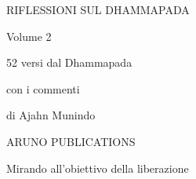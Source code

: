 \documentclass[a4paper,portrait,12pt]{article}
\begin{document}
\setlength{\oddsidemargin}{2cm-1in}
\setlength{\textwidth}{\paperwidth - 2cm-2cm}

RIFLESSIONI SUL DHAMMAPADA





Volume 2





52 versi dal Dhammapada


con i commenti


di Ajahn Munindo






















































































ARUNO PUBLICATIONS


\newpage






Mirando all'obiettivo della liberazione 
\end{document}
